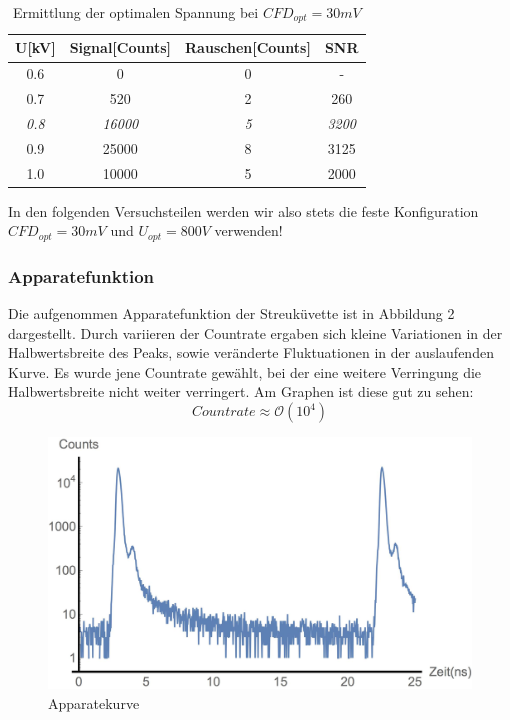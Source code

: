 \documentclass{article}
\begin{document}
\begin{table}[h]
  \centering
  \begin{tabular}{c|c|c|c}
    U[kV] & Signal[Counts] & Rauschen[Counts] & SNR \\
    \hline
    0.6   &     0          & 0                & -\\
    0.7   &    520         & 2                & 260\\
    \textit{0.8}   &  \textit{16000}         & \textit{5}                & \textit{3200}\\
    0.9   &     25000      & 8                & 3125\\
    1.0   &     10000      & 5                & 2000\\
  \end{tabular}
  \caption{Ermittlung der optimalen Spannung bei $CFD_{opt}=30mV$}
\end{table}

In den folgenden Versuchsteilen werden wir also stets die feste Konfiguration $CFD_{opt}=30mV$ und $ U_{opt}=800V$ verwenden!

\subsubsection{Apparatefunktion}
Die aufgenommen Apparatefunktion der Streuküvette ist in Abbildung 2 dargestellt. Durch variieren der Countrate ergaben sich
kleine Variationen in der Halbwertsbreite des Peaks, sowie veränderte Fluktuationen in der auslaufenden Kurve. Es wurde jene Countrate
gewählt, bei der eine weitere Verringung die Halbwertsbreite nicht weiter verringert. Am Graphen ist diese gut zu sehen:
$$Countrate \approx \mathcal{O}(10^4)$$

\begin{figure}[h]
  \centering
  \includegraphics[width=\textwidth]{Bilder/apparatekurve.jpg}
  \caption{Apparatekurve}
\end{figure}
\end{document}
